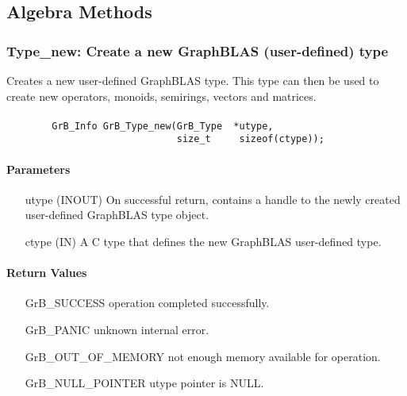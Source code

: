 \subsection{Algebra Methods}
\label{Sec:AlgebraMethods}


\subsubsection{{\sf Type\_new}: Create a new GraphBLAS (user-defined) type}
\label{Sec:TypeNew}

Creates a new user-defined GraphBLAS type. This type can then be used to create new
operators, monoids, semirings, vectors and matrices.

\paragraph{\syntax}

\begin{verbatim}
        GrB_Info GrB_Type_new(GrB_Type  *utype,
                              size_t     sizeof(ctype));
\end{verbatim}

\paragraph{Parameters}

\begin{itemize}[leftmargin=1.1in]
    \item[{\sf utype}] ({\sf INOUT}) On successful return, contains a handle 
                                     to the newly created user-defined GraphBLAS 
                                     type object.
	\item[{\sf ctype}] ({\sf IN})    A C type that defines the new GraphBLAS 
                                     user-defined type.
\end{itemize}

\paragraph{Return Values}

\begin{itemize}[leftmargin=2.1in]
\item[{\sf GrB\_SUCCESS}]           operation completed successfully.
\item[{\sf GrB\_PANIC}]             unknown internal error.
\item[{\sf GrB\_OUT\_OF\_MEMORY}]          not enough memory available for operation.
\item[{\sf GrB\_NULL\_POINTER}]    {\sf utype} pointer is {\sf NULL}.
\end{itemize}

